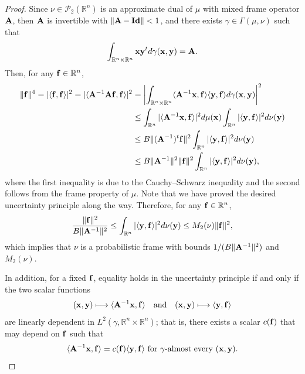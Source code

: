 \documentclass{amsart}
\numberwithin{equation}{section}
\newcommand{\norm}[1]{\left\Vert#1\right\Vert}
\newcommand{\bA}{{\bf A}}
\newcommand{\bI}{{\bf Id}}
\theoremstyle{plain}
\theoremstyle{remark}
\theoremstyle{definition}
\begin{document}
\begin{proof}
 Since $\nu \in \mathcal{P}_2(\mathbb{R}^n)$ is an approximate dual of $\mu$ with mixed frame operator $\bf A$, then  $\bf A$ is invertible with $\norm{\bA - \bI}<1$, and there exists $\gamma \in \Gamma(\mu, \nu)$ such that 
   $$   \int_{\mathbb{R}^n \times \mathbb{R}^n} {\bf x} {\bf y}^t d\gamma({\bf x, y}) = {\bf A}.$$
   Then, for any ${\bf f} \in \mathbb{R}^n$, 
   \begin{equation*}
   \begin{split}
       \|{\bf f}\|^4 = |\langle {\bf f}, {\bf f} \rangle|^2 = |\langle {\bf A}^{-1}{\bf A}{\bf f}, {\bf f} \rangle|^2 &= \left|\int_{\mathbb{R}^n \times \mathbb{R}^n} \langle {\bf A}^{-1} {\bf x}, {\bf f} \rangle \langle {\bf y,f} \rangle d\gamma({\bf x, y}) \right |^2 \\
       & \leq \int_{\mathbb{R}^n} |\langle {\bf A }^{-1} {\bf x}, {\bf f} \rangle |^2 d\mu({\bf x}) \int_{\mathbb{R}^n} |\langle {\bf y}, {\bf f} \rangle |^2 d\nu({\bf y}) \\
       & \leq B \|({\bf A }^{-1})^t {\bf f}\|^2 \int_{\mathbb{R}^n} |\langle {\bf y}, {\bf f} \rangle |^2 d\nu({\bf y}) \\
       &\leq B\|{\bf A }^{-1}\|^2 \| {\bf f}\|^2 \int_{\mathbb{R}^n} |\langle {\bf y}, {\bf f} \rangle |^2 d\nu({\bf y}),
   \end{split}
   \end{equation*}
where the first inequality is due to the Cauchy–Schwarz inequality and the second follows from the frame property of $\mu$. Note that we have proved the desired uncertainty principle along the way. Therefore, for any ${\bf f} \in \mathbb{R}^n$,
\begin{equation*}
       \frac{\|{\bf f}\|^2}{B \|{\bf A }^{-1}\|^2}
       \leq  \int_{\mathbb{R}^n} |\langle {\bf y}, {\bf f} \rangle |^2 d\nu({\bf y}) \leq M_2(\nu)\|{\bf f}\|^2,
   \end{equation*}
 which implies that $\nu$ is a probabilistic frame with bounds $ 1/(B \| {\bf A}^{-1}\|^2)$ and $M_2(\nu)$. 

In addition, for a fixed ${\bf f}$, equality holds in the uncertainty principle if and only if the two scalar functions
\[
({\bf x},{\bf y})\longmapsto \langle {\bf A}^{-1}{\bf x},{\bf f}\rangle
\quad\text{and}\quad
({\bf x},{\bf y})\longmapsto \langle {\bf y},{\bf f}\rangle
\]
are linearly dependent in $L^{2}(\gamma, \mathbb{R}^n \times \mathbb{R}^n)$; that is, there exists a scalar
$c({\bf f})$ that may depend on ${\bf f}$ such that
\begin{equation}\label{eq:inner product ae}
\langle {\bf A}^{-1}{\bf x},{\bf f}\rangle
= c({\bf f}) \langle {\bf y},{\bf f}\rangle
\ \text{for $\gamma$-almost every }({\bf x},{\bf y}).
\end{equation}


\end{proof}
\end{document}
